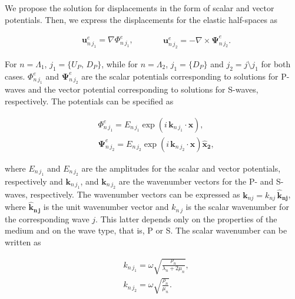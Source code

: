 \documentclass[draft]{agujournal2019}
\begin{document}
We propose the solution for displacements in the form of scalar and vector potentials. Then, we express the displacements for the elastic half-spaces as
\begin{linenomath*}
\begin{equation}\label{Eq.a9}
\begin{aligned}
& \bm{u}_{n\,j_1}^e = \nabla \Phi^e_{n\,j_1},
\end{aligned}
\qquad
\begin{aligned}
& \bm{u}_{n\,j_2}^e = -  \nabla  \times \bm{\Psi}^e_{n\,j_2}.
\end{aligned}
\end{equation}
\end{linenomath*}
For $n =\Lambda_1 $,  $j_1 = \{U_P,\,D_P\}$,  while for $n =\Lambda_2 $, $j_1 = \{D_P\}$ and $j_2=j \setminus j_1$ for both cases. $\Phi^e_{n\,j_1}$ and $\bm{\Psi}^e_{n\,j_2}$ are the scalar potentials corresponding to solutions for P-waves and the vector potential corresponding to solutions for S-waves, respectively. The potentials can be specified as
\begin{linenomath*}
\begin{equation}\label{Eq.a10}
\begin{split}
&  \Phi^e_{n\,j_1} = E_{n\,j_1} \exp \left( i\, \bm{k}_{n\, j_1}\cdot \bm{x} \right), \\
& \bm{\Psi}^e_{n\,j_2} =  E_{n\,j_2} \exp \left( i\, \bm{k}_{n\, j_2} \cdot \bm{x} \right) \bm{\hat {x}_2}, 
\end{split}
\end{equation}
\end{linenomath*}
where $E_{n\,j_1}$ and $E_{n\,j_2}$ are the amplitudes for the scalar and vector potentials, respectively and $\bm{k}_{n \,j_1}$, and $\bm{k}_{n\, j_2}$ are the wavenumber vectors for the P- and S-waves, respectively. The wavenumber vectors can be expressed as $\bm{k}_{n j} = k_{nj} \, \bm{\hat {k}_{nj}}$, where $\bm{\hat {k}_{n\, j}}$ is the unit wavenumber vector and $k_{n\,j}$ is the scalar wavenumber for the corresponding wave $j$. This latter depends only on the properties of the medium and on the wave type, that is, P or S. The scalar wavenumber can be written as
\begin{linenomath*}
\begin{equation}\label{Eq.a11}
\begin{split}
& k_{n\,j_1}  = \omega \sqrt{\frac{\rho_n}{\lambda_n + 2 \mu_n}}, \\[10pt]
& k_{n\,j_2}  = \omega \sqrt{\frac{\rho_n}{ \mu_n}}.
\end{split}
\end{equation}
\end{linenomath*}
\end{document}
